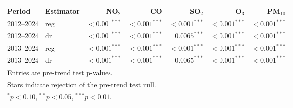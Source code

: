 \begin{tabular}{llrrrrr}
\toprule
Period & Estimator & NO$_2$ & CO & SO$_2$ & O$_3$ & PM$_{10}$ \\
\midrule
2012--2024 & reg & $<0.001^{***}$ & $<0.001^{***}$ & $<0.001^{***}$ & $<0.001^{***}$ & $<0.001^{***}$ \\
2012--2024 & dr & $<0.001^{***}$ & $<0.001^{***}$ & $0.0065^{***}$ & $<0.001^{***}$ & $<0.001^{***}$ \\
2013--2024 & reg & $<0.001^{***}$ & $<0.001^{***}$ & $<0.001^{***}$ & $<0.001^{***}$ & $<0.001^{***}$ \\
2013--2024 & dr & $<0.001^{***}$ & $<0.001^{***}$ & $0.0065^{***}$ & $<0.001^{***}$ & $<0.001^{***}$ \\
\bottomrule
\multicolumn{7}{l}{\footnotesize Entries are pre-trend test p-values.} \\
\multicolumn{7}{l}{\footnotesize Stars indicate rejection of the pre-trend test null.} \\
\multicolumn{7}{l}{\footnotesize $^{*}p<0.10$, $^{**}p<0.05$, $^{***}p<0.01$.} \\
\end{tabular}
